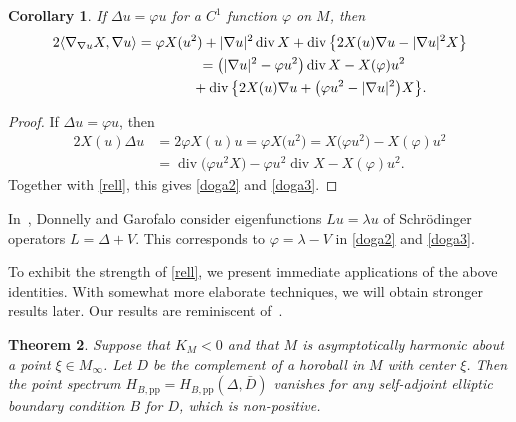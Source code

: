\documentclass[10pt,a4paper]{amsart}
\numberwithin{equation}{section}
\newtheorem{Theorem}{Theorem}[section]
\newtheorem{Corollary}[Theorem]{Corollary}
\DeclareMathOperator{\diver}{div}
\def\p{\mathrm{pp}}
\begin{document}
\begin{Corollary}%
If $\Delta u=\varphi u$ for a $C^1$ function $\varphi$ on $M$, then
\begin{gather}
 2\langle\nabla_{\nabla u}X,\nabla u\rangle
= \varphi X(u^2) + |\nabla u|^2\diver X + \diver\big\{2X(u)\nabla u-|\nabla u|^2X\big\} \label{doga2} \\
\hphantom{2\langle\nabla_{\nabla u}X,\nabla u\rangle}{}= \bigl(|\nabla u|^2 - \varphi u^2\bigr)\diver X - X(\varphi)u^2 \notag\\
 \hphantom{2\langle\nabla_{\nabla u}X,\nabla u\rangle=}{}+ \diver\big\{2X(u)\nabla u+\bigl(\varphi u^2-|\nabla u|^2\bigr)X\big\}. \label{doga3}
\end{gather}
\end{Corollary}

\begin{proof}
If $\Delta u=\varphi u$, then
\begin{align*}
 2X(u)\Delta u &= 2\varphi X(u)u = \varphi X\bigl(u^2\bigr) = X\bigl(\varphi u^2\bigr) - X(\varphi)u^2 \\
 &= \diver\bigl(\varphi u^2X\bigr) - \varphi u^2\diver X - X(\varphi)u^2.
\end{align*}
Together with \eqref{rell}, this gives \eqref{doga2} and \eqref{doga3}.
\end{proof}

In~\cite{DoGa97}, Donnelly and Garofalo consider eigenfunctions $Lu=\lambda u$ of Schr\"odinger operators $L=\Delta+V$.
This corresponds to $\varphi=\lambda-V$ in \eqref{doga2} and \eqref{doga3}.

To exhibit the strength of \eqref{rell}, we present immediate applications of the above identities.
With somewhat more elaborate techniques, we will obtain stronger results later.
Our results are reminiscent of~\cite[Satz 2]{Rellich43}.

\begin{Theorem}\label{nopointd}
Suppose that $K_M<0$ and that $M$ is asymptotically harmonic about a point $\xi\in M_\infty$.
Let $D$ be the complement of a horoball in $M$ with center $\xi$.
Then the point spectrum $H_{B,\p}=H_{B,\p}(\Delta, \bar{D} )$ vanishes for any self-adjoint elliptic
boundary condition $B$ for $D$, which is non-positive.
\end{Theorem}
\end{document}
